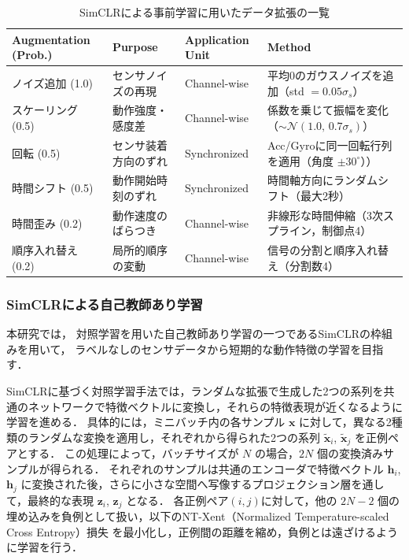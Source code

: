 \documentclass[submit]{ipsj}
\newcommand{\rev}[1]{{\color{red}#1}}
\begin{document}
{%

\begin{table}[t]
\centering
\caption{\rev{SimCLRによる事前学習に用いたデータ拡張の一覧}}
\begin{tabular}{l|p{2.9cm}|p{2.8cm}|p{6.0cm}}
\hline
Augmentation (Prob.) & Purpose & Application Unit & Method \\
\hline
ノイズ追加 (1.0)
& センサノイズの再現
& Channel-wise
& 平均0のガウスノイズを追加（std $=0.05\sigma_s$） \\

スケーリング (0.5)
& 動作強度・感度差
& Channel-wise
& 係数を乗じて振幅を変化（$\sim \mathcal{N}(1.0,\,0.7\sigma_s)$） \\

回転 (0.5)
& センサ装着方向のずれ
& Synchronized
& Acc/Gyroに同一回転行列を適用（角度 $\pm 30^\circ$）） \\

時間シフト (0.5)
& 動作開始時刻のずれ
& Synchronized
& 時間軸方向にランダムシフト（最大2秒） \\

時間歪み (0.2)
& 動作速度のばらつき
& Channel-wise
& 非線形な時間伸縮（3次スプライン，制御点4） \\

順序入れ替え (0.2)
& 局所的順序の変動
& Channel-wise
& 信号の分割と順序入れ替え（分割数4） \\
\hline
\end{tabular}
\label{tab:augmentation}
\end{table}


\subsubsection{\rev{SimCLRによる自己教師あり学習}}
\rev{本研究では，
対照学習を用いた自己教師あり学習の一つであるSimCLRの枠組みを用いて，
ラベルなしのセンサデータから短期的な動作特徴の学習を目指す．}

SimCLRに基づく対照学習手法では，ランダムな拡張で生成した2つの系列を共通のネットワークで特徴ベクトルに変換し，それらの特徴表現が近くなるように学習を進める．
具体的には，ミニバッチ内の各サンプル \(\boldsymbol{x}\) に対して，異なる2種類のランダムな変換を適用し，それぞれから得られた2つの系列 \(\tilde{\boldsymbol{x}}_i\), \(\tilde{\boldsymbol{x}}_j\) を正例ペアとする．  
この処理によって，バッチサイズが \(N\) の場合，\(2N\) 個の変換済みサンプルが得られる．  
それぞれのサンプルは共通のエンコーダで特徴ベクトル \(\boldsymbol{h}_i\), \(\boldsymbol{h}_j\) に変換された後，さらに小さな空間へ写像するプロジェクション層を通して，最終的な表現 \(\boldsymbol{z}_i\), \(\boldsymbol{z}_j\) となる．  
各正例ペア\((i, j)\)に対して，他の \(2N - 2\) 個の埋め込みを負例として扱い，以下のNT-Xent（Normalized Temperature-scaled Cross Entropy）損失\cite{chen2020simple} を最小化し，正例間の距離を縮め，負例とは遠ざけるように学習を行う．


}
\end{document}
